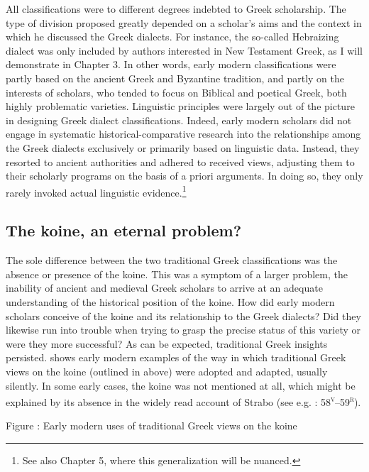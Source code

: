 \documentclass[output=paper]{langsci/langscibook}
\begin{document}
All classifications were to different degrees indebted to Greek scholarship. The type of division proposed greatly depended on a scholar’s aims and the context in which he discussed the Greek dialects. For instance, the so-called Hebraizing dialect was only included by authors interested in New Testament Greek, as I will demonstrate in Chapter 3. In other words, early modern classifications were partly based on the ancient Greek and Byzantine tradition, and partly on the interests of scholars, who tended to focus on Biblical and poetical Greek, both highly problematic varieties. Linguistic principles were largely out of the picture in designing Greek dialect classifications. Indeed, early modern scholars did not engage in systematic historical-comparative research into the relationships among the Greek dialects exclusively or primarily based on linguistic data. Instead, they resorted to ancient authorities and adhered to received views, adjusting them to their scholarly programs on the basis of a priori arguments. In doing so, they only rarely invoked actual linguistic evidence.\footnote{See also Chapter 5, where this generalization will be nuanced.}

\subsection{The koine, an eternal problem?}
\hypertarget{Toc19704815}{}
The sole difference between the two traditional Greek classifications was the absence or presence of the koine. This was a symptom of a larger problem, the inability of ancient and medieval Greek scholars to arrive at an adequate understanding of the historical position of the koine. How did early modern scholars conceive of the koine and its relationship to the Greek dialects? Did they likewise run into trouble when trying to grasp the precise status of this variety or were they more successful? As can be expected, traditional Greek insights persisted.  shows early modern examples of the way in which traditional Greek views on the koine (outlined in  above) were adopted and adapted, usually silently. In some early cases, the koine was not mentioned at all, which might be explained by its absence in the widely read account of Strabo (see e.g. \citealt{Stapleton1566}: 58\textsc{\textsuperscript{v}}–59\textsc{\textsuperscript{r}}).

\begin{stylecaption}
Figure : Early modern uses of traditional Greek views on the koine
\end{stylecaption}
\end{document}
